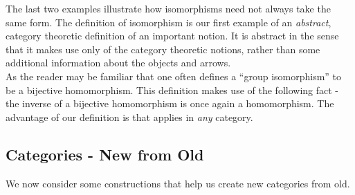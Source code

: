 The last two examples illustrate how isomorphisms need not always take the same form. The definition of isomorphism is our first example of an \emph{abstract}, category theoretic definition of an important notion. It is abstract in the sense that it makes use only of the category theoretic notions, rather than some additional information about the objects and arrows.\\
As the reader may be familiar that one often defines a ``group isomorphism'' to be a bijective homomorphism. This definition makes use of the following fact - the inverse of a bijective homomorphism is once again a homomorphism. The advantage of our definition is that applies in \emph{any} category.
%
\subsection{Categories - New from Old}
We now consider some constructions that help us create new categories from old.
